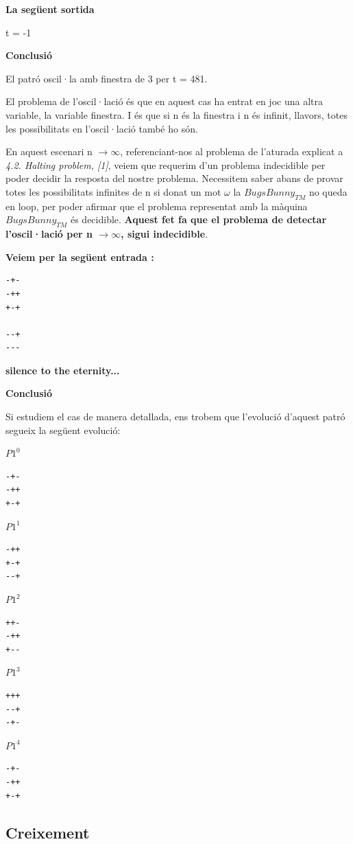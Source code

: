 \documentclass[12pt,a4paper]{report}
\def \w{$\omega$}
\def \tm{$BugsBunny_{TM} $}
\begin{document}
\textbf{La següent sortida}

t = -1

\textbf{Conclusió}

El patró oscil·la amb finestra de 3 per t = 481.


El problema de l'oscil·lació és que en aquest cas ha entrat en joc una altra variable, la variable finestra. I és que si n és la finestra i n és infinit, llavors, totes les possibilitats en l'oscil·lació també ho són.

En aquest escenari n $\rightarrow \infty$, referenciant-nos al problema de l’aturada explicat a \textit{4.2. Halting problem, [1]}, veiem que requerim d'un problema indecidible per poder decidir la resposta del nostre problema. Necessitem saber abans de provar totes les possibilitats infinites de n si donat un mot \w{} la \tm{} no queda en loop, per poder afirmar que el problema representat amb la màquina \tm{} és decidible. \textbf{Aquest fet fa que el problema de detectar l'oscil·lació per n $\rightarrow \infty$,  sigui indecidible}.

\textbf{Veiem per la següent entrada :}

\begin{lstlisting}
-+-
-++
+-+

--+
---
\end{lstlisting}

\textbf{silence to the eternity...}

\textbf{Conclusió}

Si estudiem el cas de manera detallada, ens trobem que l'evolució d'aquest patró segueix la següent evolució:


$P1^0$
\begin{lstlisting}
-+-
-++
+-+
\end{lstlisting}

$P1^1$
\begin{lstlisting}
-++
+-+
--+
\end{lstlisting}

$P1^2$
\begin{lstlisting}
++-
-++
+--
\end{lstlisting}

$P1^3$
\begin{lstlisting}
+++
--+
-+-
\end{lstlisting}

$P1^4$
\begin{lstlisting}
-+-
-++
+-+
\end{lstlisting}


\subsection{Creixement}
\end{document}
